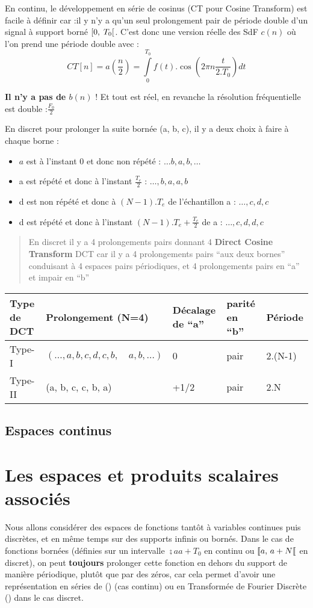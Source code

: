 En continu, le développement en série de cosinus (CT pour Cosine
Transform) est facile à définir car :il y n'y a qu'un seul prolongement pair de période double
d'un signal à support borné $\ST0$. C'est donc une
version réelle des SdF $c(n)$ où l'on prend une période double avec :
$$CT[n] = a(\frac{n}{2}) = \int\limits_0^{T_0} f(t) . \cos\left(2\pi n \frac{t}{2.T_0}\right) dt$$

\textbf{Il n'y a pas de $b(n)$} ! Et tout est réel, en revanche la
résolution fréquentielle est double :$\frac{F_0}{2}$

En discret pour prolonger la suite bornée (a, b, c), il y a deux choix à
faire à chaque borne : 
\begin{itemize}
  \item $a$ est à l'instant 0 et donc non répété : $\ldots b,a,b,\ldots{}$
  \item a est répété et donc à l'instant $\frac{T_e}{2}$ : $\ldots, b, a, a, b$
  \item d est non répété et donc à $(N-1).T_e$ de l'échantillon a : $\ldots, c, d, c$ 
  \item d est répété et donc à l'instant $(N-1).T_e + \frac{T_e}{2}$ de a : $\ldots, c, d, d, c$    
\end{itemize}

\begin{quote}
En discret il y a 4 prolongements pairs donnant 4 \textbf{Direct Cosine
Transform} DCT car il y a 4 prolongements pairs ``aux deux bornes'' conduisant à 4
espaces pairs périodiques, et 4 prolongements pairs en ``a'' et impair en
``b''
\end{quote}

\begin{tabular}{lllll}
\hline
Type de DCT & Prolongement (N=4) & Décalage de ``a'' & parité en ``b'' &
Période \\
\hline
Type-I & $(\ldots, a, b, c, d, c, b, \quad a, b, \ldots)$ & 0 & pair & 2.(N-1) \\
Type-II & (a, b, c, c, b, a) & +1/2 & pair & 2.N \\
\hline
\end{tabular}

\subsection{Espaces continus}


\section{Les espaces et produits scalaires associés}
Nous allons considérer des espaces de fonctions tantôt à variables
continues puis discrètes, et en même temps sur des supports infinis ou
bornés. Dans le cas de fonctions bornées (définies sur un intervalle $\semi{a}{a+T_0}$ en continu ou ${[\![ a,\,a+N[\![}$ en discret), on peut \textbf{toujours} prolonger cette fonction
en dehors du support de manière périodique, plutôt que par des zéros, car cela permet d'avoir une représentation en séries de \Fourier{} (\sdf{}) (cas continu) ou en Transformée de Fourier Discrète (\TFD{}) dans le cas discret.

